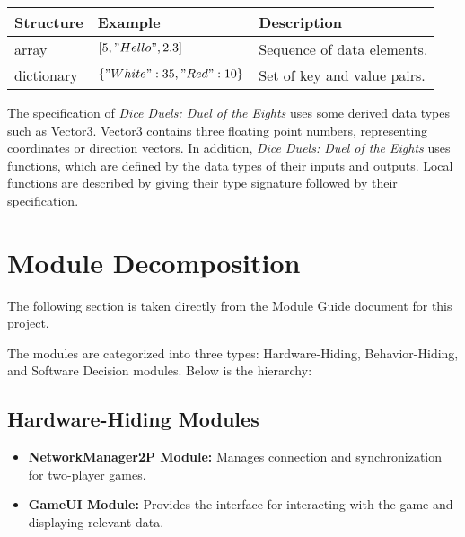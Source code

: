 \documentclass[12pt, titlepage]{article}
\begin{document}
\begin{center}
\renewcommand{\arraystretch}{1.2}
\noindent 
\begin{tabular}{l l l} 
\toprule 
\textbf{Structure} & \textbf{Example} & \textbf{Description}\\ 
\midrule
array & $[5, "Hello", 2.3]$ & Sequence of data elements.\\
dictionary & $\{"White": 35, "Red": 10\}$ & Set of key and value pairs.\\
\bottomrule
\end{tabular} 
\end{center}

\noindent
The specification of \textit{Dice Duels: Duel of the Eights} uses some derived data types such as Vector3. Vector3 contains three floating point numbers, representing coordinates or direction vectors. In addition, \textit{Dice Duels: Duel of the Eights} uses functions, which are defined by the data types of their inputs and outputs. Local functions are described by giving their type signature followed by their specification.

\section{Module Decomposition}

The following section is taken directly from the Module Guide document for this project.

The modules are categorized into three types: Hardware-Hiding, Behavior-Hiding, and Software Decision modules. Below is the hierarchy:

\subsection{Hardware-Hiding Modules}
\begin{itemize}
    \item \textbf{NetworkManager2P Module:} Manages connection and synchronization for two-player games.
    \item \textbf{GameUI Module:} Provides the interface for interacting with the game and displaying relevant data.
\end{itemize}
\end{document}
